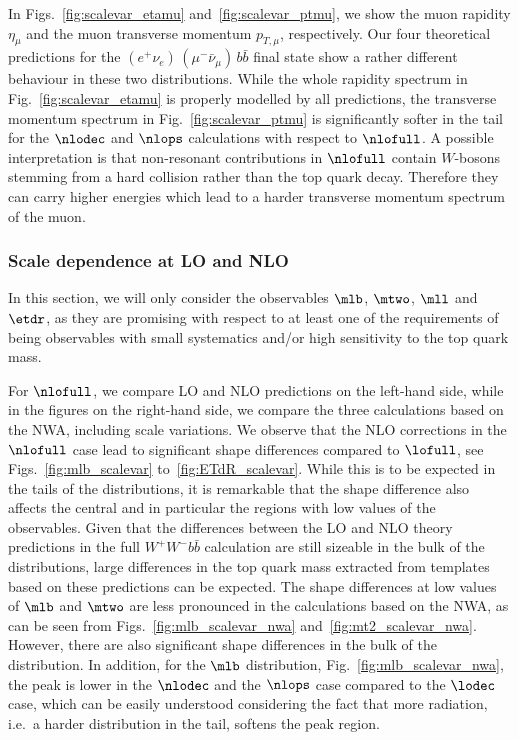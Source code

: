 In Figs.~\ref{fig:scalevar_etamu} and~\ref{fig:scalevar_ptmu}, we show the muon rapidity $\eta_{\mu}$ and the muon transverse momentum $p_{T,\mu}$, respectively.
Our four theoretical predictions for the $(e^+ \nu_e)\,(\mu^- \bar{\nu}_{\mu})\,b\bar{b}$ final state show a rather different behaviour in these two distributions.
While the whole rapidity spectrum in Fig.~\ref{fig:scalevar_etamu} is properly modelled by all predictions,
the transverse momentum spectrum in Fig.~\ref{fig:scalevar_ptmu} is significantly softer in the tail for the $\nlodec$ and $\nlops$ calculations with respect to $\nlofull$.
A possible interpretation is that non-resonant contributions in $\nlofull$ contain $W$-bosons stemming from a
hard collision rather than the top quark decay. Therefore they can carry higher energies which lead to a harder transverse momentum spectrum of the muon.


\subsubsection{Scale dependence at LO and NLO}
\label{subsec:scaledep}

In this section, we will only consider the observables $\mlb$, $\mtwo$, $\mll$ and $\etdr$, as they are promising with respect to
at least one of the requirements of being observables with small systematics and/or high sensitivity to the top quark mass.

For $\nlofull$, we compare LO and NLO predictions on the left-hand side, while in the figures on the right-hand side, we compare the three calculations based on the NWA,
including scale variations.
We observe that the NLO corrections in the $\nlofull$ case lead to significant shape differences compared to $\lofull$,
see Figs.~\ref{fig:mlb_scalevar} to~\ref{fig:ETdR_scalevar}.
While this is to be expected in the tails of the distributions, it is
remarkable that the shape difference also affects the central and in particular the regions with low values of the observables.
Given that the differences between the LO and NLO theory predictions in the full $W^+W^-b\bar{b}$ calculation are still sizeable in the bulk of the distributions, large
differences in the top quark mass extracted from templates based on these predictions can be expected.
The shape differences at low values of $\mlb$ and $\mtwo$ are  less pronounced in the calculations based on the NWA,
as can be seen from Figs.~\ref{fig:mlb_scalevar_nwa}  and~\ref{fig:mt2_scalevar_nwa}.
However, there are also significant shape differences in the bulk of the distribution.
In addition, for the $\mlb$ distribution, Fig.~\ref{fig:mlb_scalevar_nwa}, the peak is lower in the $\nlodec$ and the $\nlops$ case
 compared to the $\lodec$ case, which can be easily understood considering the fact that  more radiation, i.e.~a harder distribution in the tail,
softens the peak region.


